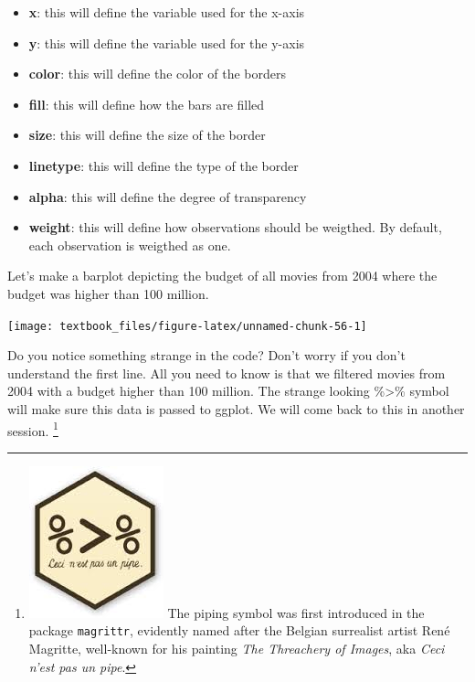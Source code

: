\documentclass[]{tufte-book}
\newenvironment{Shaded}{}{}
\newcommand{\DecValTok}[1]{\textcolor[rgb]{0.25,0.63,0.44}{#1}}
\newcommand{\KeywordTok}[1]{\textcolor[rgb]{0.00,0.44,0.13}{\textbf{#1}}}
\newcommand{\NormalTok}[1]{#1}
\newcommand{\OperatorTok}[1]{\textcolor[rgb]{0.40,0.40,0.40}{#1}}
\newcommand{\StringTok}[1]{\textcolor[rgb]{0.25,0.44,0.63}{#1}}
\providecommand{\tightlist}{%
  \setlength{\itemsep}{0pt}\setlength{\parskip}{0pt}}
\begin{document}
\begin{itemize}
\tightlist
\item
  \textbf{x}: this will define the variable used for the x-axis
\item
  \textbf{y}: this will define the variable used for the y-axis
\item
  \textbf{color}: this will define the color of the borders
\item
  \textbf{fill}: this will define how the bars are filled
\item
  \textbf{size}: this will define the size of the border
\item
  \textbf{linetype}: this will define the type of the border
\item
  \textbf{alpha}: this will define the degree of transparency
\item
  \textbf{weight}: this will define how observations should be weigthed. By default, each observation is weigthed as one.
\end{itemize}

Let's make a barplot depicting the budget of all movies from 2004 where the budget was higher than 100 million.

\begin{Shaded}
\end{Shaded}

\texttt{[image: textbook\_files/figure-latex/unnamed-chunk-56-1]}

Do you notice something strange in the code? Don't worry if you don't understand the first line. All you need to know is that we filtered movies from 2004 with a budget higher than 100 million. The strange looking \%\textgreater\% symbol will make sure this data is passed to ggplot. We will come back to this in another session. \footnote{\includegraphics{images/pipe.jpg} The piping symbol was first introduced in the package \texttt{magrittr}, evidently named after the Belgian surrealist artist René Magritte, well-known for his painting \emph{The Threachery of Images}, aka \emph{Ceci n'est pas un pipe}.}
\end{document}
